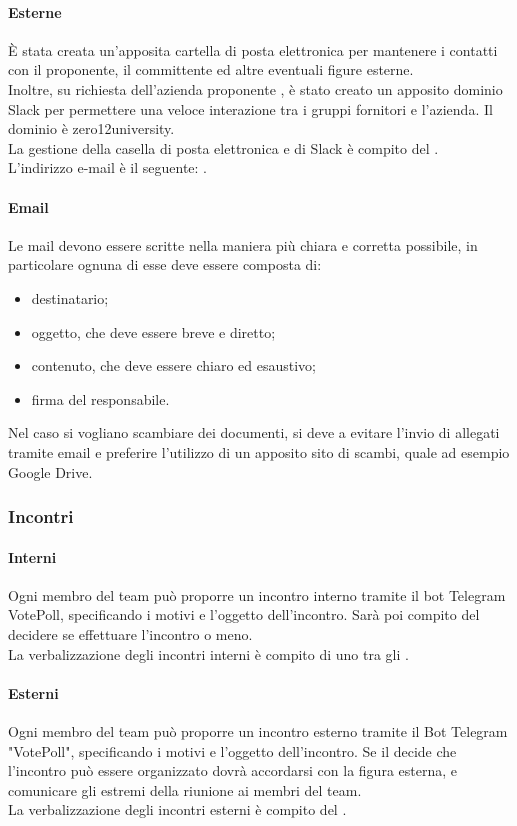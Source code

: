  \paragraph{Esterne}
 È stata creata un'apposita cartella di posta elettronica per mantenere i contatti con il proponente, il committente ed altre eventuali figure esterne.\\
  Inoltre, su richiesta dell'azienda proponente \PROPONENTE, è stato creato un apposito dominio Slack per permettere una veloce interazione tra i gruppi fornitori e l'azienda. Il dominio è zero12university. \\
 La gestione della casella di posta elettronica e di Slack è compito del \RESP. \\
 L'indirizzo e-mail è il seguente: \EMAIL.
 \paragraph{Email}
 Le mail devono essere scritte nella maniera più chiara e corretta possibile, in particolare ognuna di esse deve essere composta di:
 \begin{itemize}
 	\item destinatario;
 	\item oggetto, che deve essere breve e diretto;
	\item contenuto, che deve essere chiaro ed esaustivo;
	\item firma del responsabile.
 \end{itemize}
 Nel caso si vogliano scambiare dei documenti, si deve a evitare l'invio di allegati tramite email e preferire l'utilizzo di un apposito sito di scambi, quale ad esempio Google Drive.
\subsubsection{Incontri}
 \paragraph{Interni}
 Ogni membro del team può proporre un incontro interno tramite il bot Telegram VotePoll, specificando i motivi e l'oggetto dell'incontro. 
 Sarà poi compito del \RESP{} decidere se effettuare l'incontro o meno.\\
  La verbalizzazione degli incontri interni è compito di uno tra gli \AMMP.
 \paragraph{Esterni} 
 Ogni membro del team può proporre un incontro esterno tramite il Bot Telegram "VotePoll", specificando i motivi e l'oggetto dell'incontro. 
Se il \RESP{} decide che l'incontro può essere organizzato dovrà accordarsi con la figura esterna, e comunicare gli estremi della riunione ai membri del team.\\
 La verbalizzazione degli incontri esterni è compito del \RESP.
